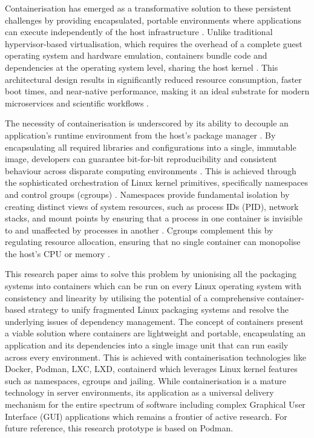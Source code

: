 \documentclass[journal,onecolumn]{IEEEtran}
\begin{document}
Containerisation has emerged as a transformative solution to these persistent challenges by providing encapsulated, portable environments where applications can execute independently of the host infrastructure \cite{Zam2025}. Unlike traditional hypervisor-based virtualisation, which requires the overhead of a complete guest operating system and hardware emulation, containers bundle code and dependencies at the operating system level, sharing the host kernel \cite{Moric2025}\cite{Jarkas2025}. This architectural design results in significantly reduced resource consumption, faster boot times, and near-native performance, making it an ideal substrate for modern microservices and scientific workflows \cite{Varun2019}\cite{Moric2025}\cite{BanegasLuna2025}\cite{BanegasLuna2025}\cite{BenKebaier2024}.

The necessity of containerisation is underscored by its ability to decouple an application's runtime environment from the host's package manager \cite{Zam2025}. By encapsulating all required libraries and configurations into a single, immutable image, developers can guarantee bit-for-bit reproducibility and consistent behaviour across disparate computing environments \cite{Zam2025}\cite{Busaleh2025}. This is achieved through the sophisticated orchestration of Linux kernel primitives, specifically namespaces and control groups (cgroups) \cite{Moric2025}\cite{Sangam2017}. Namespaces provide fundamental isolation by creating distinct views of system resources, such as process IDs (PID), network stacks, and mount points by ensuring that a process in one container is invisible to and unaffected by processes in another \cite{Moric2025}\cite{Sangam2017}. Cgroups complement this by regulating resource allocation, ensuring that no single container can monopolise the host's CPU or memory \cite{Dua2014}.

This research paper aims to solve this problem by unionising all the packaging systems into containers which can be run on every Linux operating system with consistency and linearity by utilising the potential of a comprehensive container-based strategy to unify fragmented Linux packaging systems and resolve the underlying issues of dependency management. The concept of containers present a viable solution where containers are lightweight and portable, encapsulating an application and its dependencies into a single image unit that can run easily across every environment. This is achieved with containerisation technologies like Docker, Podman, LXC, LXD, containerd which leverages Linux kernel features such as namespaces, cgroups and jailing. While containerisation is a mature technology in server environments, its application as a universal delivery mechanism for the entire spectrum of software including complex Graphical User Interface (GUI) applications which remains a frontier of active research. For future reference, this research prototype is based on Podman. 
\end{document}
